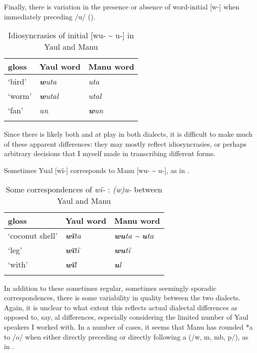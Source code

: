   Finally, there is variation in the presence or absence of word-initial [w-] when immediately preceding /u/ ().
  
\begin{table}
\caption{Idiosyncrasies of initial [wu- {\textasciitilde} u-] in Yaul and Manu}
\label{tab:18.15}


\begin{tabular}{lll}

\lsptoprule

gloss & Yaul word & Manu word\\
\midrule
‘bird’ & {\itshape \textbf{w}uta} & {\itshape uta}\\
‘worm’ & {\itshape \textbf{w}utal} & {\itshape utal}\\
‘fan’ & {\itshape un} & {\itshape \textbf{w}un}\\
\lspbottomrule
\end{tabular}
\end{table}

Since there is likely both   and   at play in both dialects, it is difficult to make much of these apparent differences: they may mostly reflect idiosyncrasies, or perhaps arbitrary decisions that I myself made in transcribing different forms.

Sometimes Yual [wï-] corresponds to Manu [wu- {\textasciitilde} u-], as in .


\begin{table}
\caption{Some correspondences of \textit{wï-} : \textit{(w)u-} between Yaul and Manu}
\label{tab:18.16}


\begin{tabular}{lll}

\lsptoprule

gloss & Yaul word & Manu word\\
\midrule
‘coconut shell’ & {\itshape \textbf{wï}ta} & {\itshape \textbf{wu}ta \textup{{\textasciitilde}} \textbf{u}ta}\\
‘leg’ & {\itshape \textbf{wï}tï} & {\itshape \textbf{wu}tï}\\
‘with’ & {\itshape \textbf{wï}l} & {\itshape \textbf{u}l}\\
\lspbottomrule
\end{tabular}
\end{table}
In addition to these sometimes regular, sometimes seemingly sporadic  correspondences, there is some variability in  quality between the two dialects. Again, it is unclear to what extent this reflects actual dialectal differences as opposed to, say, al differences, especially considering the limited number of Yaul speakers I worked with. In a number of cases, it seems that Manu has  rounded *a to /o/ when either directly preceding or directly following a   (/w, m, mb, p/), as in .


